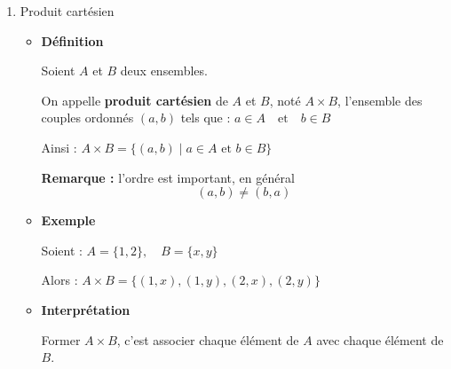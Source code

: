 \documentclass[12pt,a4paper]{article}
\begin{document}
\begin{enumerate}[label=\Roman*., font=\bfseries\color{red}]
\begin{enumerate}
\begin{enumerate}
    \textbf{Nombre d'élèves qui ont la moyenne qu'en PC :}
    
     Il s'agit de l'ensemble $A$ privé de l'intersection.
    \[ card(A \text{ uniquement}) = card(A) - card(A \cap B) \]
    \[ card(A \text{ uniquement}) = 33 - 20 = 13 \]
    Il y a \textbf{13 élèves} qui ont la moyenne uniquement en PC.
    
    On additionne ceux qui n'ont que la PC et ceux qui n'ont que les Math.
    \begin{itemize}
        \item Uniquement PC : $13$
        \item Uniquement Math : $4$
    \end{itemize}
    Total : $13 + 4 = 17$.
    Il y a \textbf{17 élèves} qui ont la moyenne dans une seule matière.

    \item \textbf{Nombre d'élèves qui n'ont la moyenne ni en Math ni en PC :}
    On cherche le complémentaire de l'union dans l'ensemble total $E$.
    \[ card(\overline{A \cup B}) = card(E) - card(A \cup B) \]
    \[ card(\overline{A \cup B}) = 45 - 37 = 8 \]
    Il y a \textbf{8 élèves} qui n'ont aucune des deux moyennes.
\end{enumerate}

 \item Produit cartésien
 
        \begin{itemize}
            \item \textbf{Définition}

Soient \( A \) et \( B \) deux ensembles.

On appelle \textbf{produit cartésien} de \( A \) et \( B \), noté \( A \times B \), l’ensemble des couples ordonnés \((a,b)\) tels que :
\(
a \in A \quad \text{et} \quad b \in B
\)

Ainsi :
\(
A \times B = \{ (a,b) \mid a \in A \text{ et } b \in B \}
\)

\textbf{Remarque :} l’ordre est important, en général
\[
(a,b) \neq (b,a)
\]

\item  \textbf{Exemple}

Soient :
\(
A = \{1,2\}, \quad B = \{x,y\}
\)

Alors :
\(
A \times B = \{ (1,x), (1,y), (2,x), (2,y) \}
\)

\item \textbf{Interprétation}

Former \( A \times B \), c’est associer chaque élément de \( A \) avec chaque élément de \( B \).


\end{itemize}
\end{enumerate}
\end{enumerate}
\end{document}
